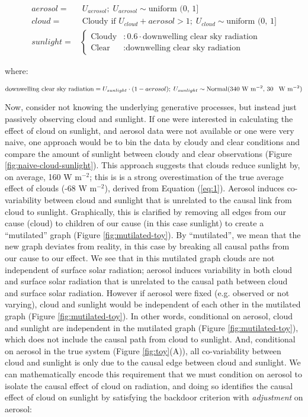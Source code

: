 \documentclass[12pt]{article}
\begin{document}
\begin{align}
  aerosol =& \; U_{aerosol}; \; U_{aerosol} \sim \text{uniform (0, 1]}\\
  cloud =& \; \text{Cloudy if } U_{cloud} + aerosol > 1; \;
           U_{cloud} \sim \text{uniform (0, 1]}\\
  sunlight =& \begin{cases}
    \text{Cloudy} &: 0.6 \cdot \text{downwelling clear sky radiation}  \\
    \text{Clear} &: \text{downwelling clear sky radiation}
  \end{cases}
                   \label{eq:1}
\end{align}

where:

\begin{equation*}
  \text{downwelling clear sky radiation} = U_{sunlight} \cdot (1 - aerosol); \;
  U_{sunlight} \sim \text{Normal(340 W m$^{-2}$, 30 \, W m$^{-2}$)}
\end{equation*}

Now, consider not knowing the underlying generative processes, but
instead just passively observing cloud and sunlight. If one were
interested in calculating the effect of cloud on sunlight, and aerosol
data were not available or one were very naive, one approach would be
to bin the data by cloudy and clear conditions and compare the amount
of sunlight between cloudy and clear observations (Figure
\ref{fig:naive-cloud-sunlight}). This approach suggests that clouds
reduce sunlight by, on average, 160 W m$^{-2}$; this is is a strong
overestimation of the true average effect of clouds (-68 W m$^{-2}$),
derived from Equation (\ref{eq:1}). Aerosol induces co-variability
between cloud and sunlight that is unrelated to the causal link from
cloud to sunlight. Graphically, this is clarified by removing all
edges from our cause (cloud) to children of our cause (in this case
sunlight) to create a ``mutilated'' graph (Figure
\ref{fig:mutilated-toy}). By ``mutilated'', we mean that the new graph
deviates from reality, in this case by breaking all causal paths from
our cause to our effect. We see that in this mutilated graph clouds
are not independent of surface solar radiation; aerosol induces
variability in both cloud and surface solar radiation that is
unrelated to the causal path between cloud and surface solar
radiation.  However if aerosol were fixed (e.g. observed or not
varying), cloud and sunlight would be independent of each other in the
mutilated graph (Figure \ref{fig:mutilated-toy}). In other words,
conditional on aerosol, cloud and sunlight are independent in the
mutilated graph (Figure \ref{fig:mutilated-toy}), which does not
include the causal path from cloud to sunlight. And, conditional on
aerosol in the true system (Figure \ref{fig:toy}(A)), all
co-variability between cloud and sunlight is only due to the causal
edge between cloud and sunlight.  We can mathematically encode this
requirement that we must condition on aerosol to isolate the causal
effect of cloud on radiation, and doing so identifies the causal
effect of cloud on sunlight by satisfying the backdoor criterion with
\textit{adjustment} on aerosol:
\end{document}
